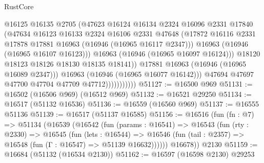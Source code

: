 \begin{lexlean}{RustCore}
\begin{coremodule}
                                  @16125
                                  @16135
                                  @2705
                                  (@47623
                                    @16124
                                    @16134
                                    @2324
                                    @16096
                                    @2331
                                    @17840
                                    (@47634
                                      @16123
                                      @16133
                                      @2324
                                      @16106
                                      @2331
                                      @47648
                                      (@17872
                                        @16116
                                        @2331
                                        @17878
                                        @17881
                                        @16963
                                        (@16946 (@16965 @16117 @2347)))
                                      @16963
                                      (@16946 (@16965 @16107 @16123)))
                                    @16963
                                    (@16946 (@16965 @16097 @16124)))
                                  @18120
                                  @18123
                                  @18126
                                  @18130
                                  @18135
                                  @18141))
                              @17881
                              @16963
                              (@16946 (@16965 @16089 @2347)))
                            @16963
                            (@16946 (@16965 @16077 @16142)))
                          @47694
                          @47697
                          @47700
                          @47704
                          @47709
                          @47712)))))))))))
@51127 := @16500 @969
@51131 := @16502 (@16506 @969) (@16512 @969)
@51132 := @16521 @29250
@51134 := @16517 (@51132 @16536)
@51136 := @16559 (@16560 @969)
@51137 := @16555 @51136
@51139 := @16517 (@51137 @16585)
@51156 := @16516
    (fun (fn : @7) =>
    @51134
      (@16539
        (@16542
          (fun (params : @16541) =>
          @16543
            (fun (rty : @2330) =>
            @16545
              (fun (lets : @16544) =>
              @16546 (fun (tail : @2357) => @16548 (fun (Γ : @16547) => @51139 @16632))))))
        @16678))
    @2130
@51159 := @16684 (@51132 (@16534 @2130))
@51162 := @16597 (@16598 @2130) @29253

\end{coremodule}
\end{lexlean}
